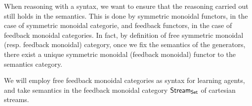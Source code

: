 When reasoning with a syntax, we want to ensure that the reasoning carried out still holds in the semantics.
This is done by symmetric monoidal functors, in the case of symmetric monoidal categorie, and feedback functors, in the case of feedback monoidal categories.
In fact, by definition of free symmetric monoidal (resp. feedback monoidal) category, once we fix the semantics of the generators, there exist a unique symmetric monoidal (feedback monoidal) functor to the semantics category.

We will employ free feedback monoidal categories as syntax for learning agents, and take semantics in the feedback monoidal category \(\mathsf{Stream}_{\mathsf{Set}}\) of cartesian streams.




